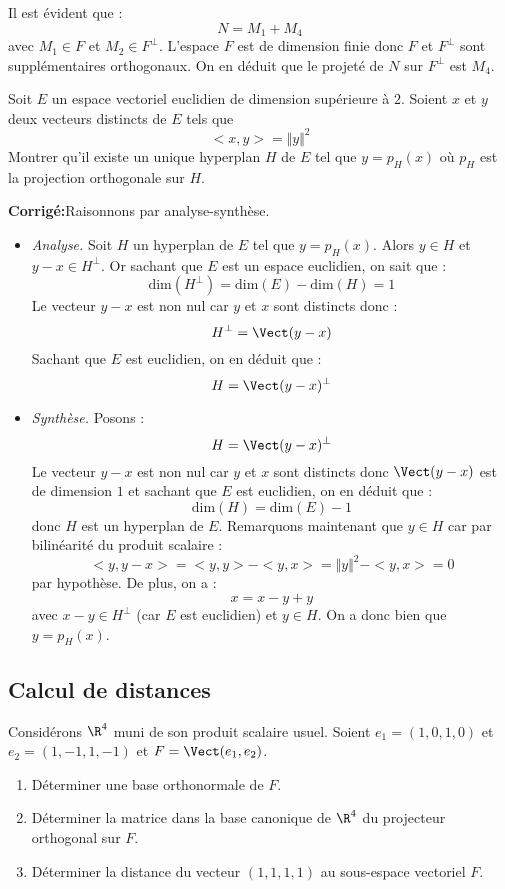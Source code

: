 \documentclass[a4paper,twoside,french,11pt]{VcCours}
\newcommand{\corr}{\textbf{Corrigé:}}
\begin{document}
\begin{enumerate}
\noindent Il est évident que :
$$ N= M_1+M_4$$
avec $M_1 \in F$ et $M_2 \in F^{\perp}$. L'espace $F$ est de dimension finie donc $F$ et $F^{\perp}$ sont supplémentaires orthogonaux. On en déduit que le projeté de $N$ sur $F^{\perp}$ est $M_4$.
\end{enumerate}

\begin{Exercice}{} Soit $E$ un espace vectoriel euclidien de dimension supérieure à $2$.  Soient $x$ et $y$ deux vecteurs distincts de $E$ tels que $$< x, y> =\Vert y \Vert^{2}$$
 Montrer qu'il existe un unique hyperplan $H$ de $E$ tel que $y = p_{H}(x)$ où $p_H$ est la projection orthogonale sur $H$.
 \end{Exercice}
 
 \corr Raisonnons par analyse-synthèse.
 
 \begin{itemize}
 \item \textit{Analyse.} Soit $H$ un hyperplan de $E$ tel que $y = p_{H}(x)$. Alors $y \in H$ et $y-x \in H^{\perp}$. Or sachant que $E$ est un espace euclidien, on sait que :
 $$ \textrm{dim}(H^{\perp})= \textrm{dim}(E) - \textrm{dim}(H)=1$$
 Le vecteur $y-x$ est non nul car $y$ et $x$ sont distincts donc :
 $$ H^{\perp}= \Vect(y-x)$$
 Sachant que $E$ est euclidien, on en déduit que :
 $$ H = \Vect(y-x)^{\perp}$$
 \item \textit{Synthèse.} Posons :
 $$ H = \Vect(y-x)^{\perp}$$
 Le vecteur $y-x$ est non nul car $y$ et $x$ sont distincts donc $ \Vect(y-x)$ est de dimension $1$ et sachant que $E$ est euclidien, on en déduit que :
 $$ \textrm{dim}(H) = \textrm{dim}(E) - 1 $$
 donc $H$ est un hyperplan de $E$. Remarquons maintenant que $y \in H$ car par bilinéarité du produit scalaire :
 $$ <y,y-x> = <y,y>-<y,x>= \Vert y \Vert^2 - <y,x>= 0$$
 par hypothèse. De plus, on a :
 $$ x=x-y+y$$
 avec $x-y \in H^{\perp}$ (car $E$ est euclidien) et $y \in H$. On a donc bien que $y = p_H(x)$.
\end{itemize}




\subsection{Calcul de distances}


\begin{Exercice}{} Considérons $\R^4$ muni de son produit scalaire usuel. Soient $e_1=(1,0,1,0)$ et $e_2=(1,-1,1,-1)$ et $F=\Vect(e_1,e_2)$.
\begin{enumerate}
    \item  Déterminer une base orthonormale de $F.$
    \item  Déterminer la matrice dans la base canonique de $\R^4$ du projecteur orthogonal
sur $F.$
    \item  Déterminer la distance du vecteur $(1,1,1,1)$ au sous-espace vectoriel  $F.$
\end{enumerate}
\end{Exercice}
\end{document}
